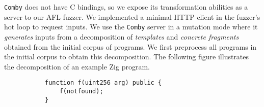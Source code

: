 \texttt{Comby} does not have C bindings, so we expose its transformation
abilities as a server to our AFL fuzzer. We implemented a minimal HTTP client
in the fuzzer's hot loop to request inputs. We use the \texttt{Comby} server in
a mutation mode where it \emph{generates} inputs from a decomposition of
\emph{templates} and \emph{concrete fragments} obtained from the initial corpus
of programs. We first preprocess all programs in the initial corpus to obtain
this decomposition. The following figure illustrates the decomposition of an
example Zig program.

\begin{figure}[h!]
\begin{subfigure}{\columnwidth}
\begin{lstlisting}[basicstyle=\scriptsize\ttfamily,numbers=none,xleftmargin=1em,xrightmargin=14em]
function f(uint256 arg) public {
    f(notfound);
}
\end{lstlisting}
\vspace{-1em}
\end{subfigure}
\end{figure}

